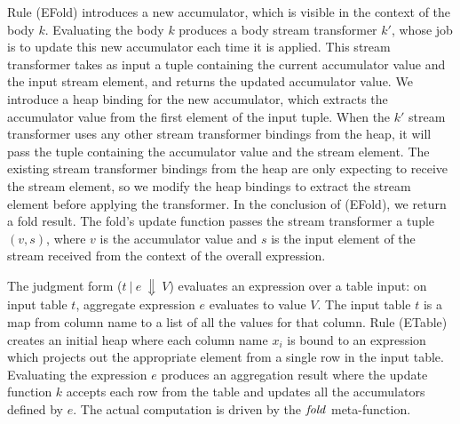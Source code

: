 Rule (EFold) introduces a new accumulator, which is visible in the context of the body $k$.
Evaluating the body $k$ produces a body stream transformer $k'$, whose job is to update this new accumulator each time it is applied.
This stream transformer takes as input a tuple containing the current accumulator value and the input stream element, and returns the updated accumulator value.
We introduce a heap binding for the new accumulator, which extracts the accumulator value from the first element of the input tuple.
When the $k'$ stream transformer uses any other stream transformer bindings from the heap, it will pass the tuple containing the accumulator value and the stream element.
The existing stream transformer bindings from the heap are only expecting to receive the stream element, so we modify the heap bindings to extract the stream element before applying the transformer.
In the conclusion of (EFold), we return a fold result.
The fold's update function passes the stream transformer a tuple $(v, s)$, where $v$ is the accumulator value and $s$ is the input element of the stream received from the context of the overall \Ic@fold@ expression.

The judgment form ($t~|~e~\Downarrow~V$) evaluates an expression over a table input: on input table $t$, aggregate expression $e$ evaluates to value $V$.
The input table $t$ is a map from column name to a list of all the values for that column.
Rule (ETable) creates an initial heap where each column name $x_i$ is bound to an expression which projects out the appropriate element from a single row in the input table. Evaluating the expression $e$ produces an aggregation result where the update function $k$ accepts each row from the table and updates all the accumulators defined by $e$. The actual computation is driven by the $\mathit{fold}$ meta-function.


